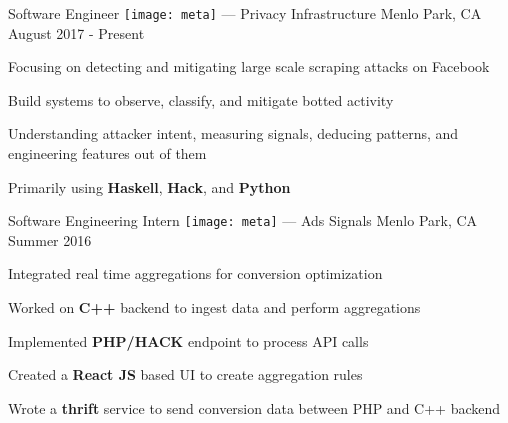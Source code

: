 


\begin{cventries}


\cventry
{Software Engineer} %
{{\texttt{[image: meta]}} --- Privacy Infrastructure} %
{Menlo Park, CA} %
{August 2017 - Present} %
{ %
\begin{cvitems}
\item {Focusing on detecting and mitigating large scale scraping attacks on Facebook}
\item {Build systems to observe, classify, and mitigate botted activity}
\item {Understanding attacker intent, measuring signals, deducing patterns, and engineering features out of them}
\item {Primarily using \textbf{Haskell}, \textbf{Hack}, and \textbf{Python}}
\end{cvitems}
}


\cventry
{Software Engineering Intern} %
{{\texttt{[image: meta]}} --- Ads Signals} %
{Menlo Park, CA} %
{Summer 2016} %
{ %
\begin{cvitems}
\item {Integrated real time aggregations for conversion optimization}
\item {Worked on \textbf{C++} backend to ingest data and perform aggregations}
\item {Implemented \textbf{PHP/HACK} endpoint to process API calls}
\item {Created a \textbf{React JS} based UI to create aggregation rules}
\item {Wrote a \textbf{thrift} service to send conversion data between PHP and C++ backend}
\end{cvitems}
}


\end{cventries}
